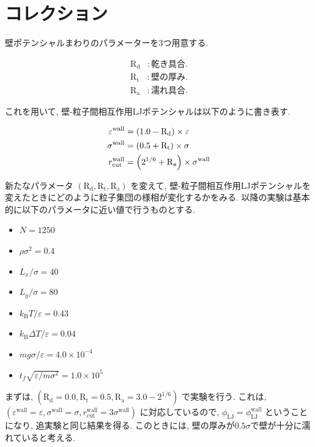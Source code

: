 \documentclass[dvipdfmx]{jsarticle}
\numberwithin{equation}{subsection}
\begin{document}
\section{コレクション}

壁ポテンシャルまわりのパラメーターを3つ用意する.

\begin{align}
  \text{R}_\text{d} &: 乾き具合. \\
  \text{R}_\text{t} &: 壁の厚み. \\
  \text{R}_\text{a} &: 濡れ具合.
\end{align}

これを用いて, 壁-粒子間相互作用LJポテンシャルは以下のように書き表す.

\begin{align}
  \varepsilon^{\text{wall}} &= \qty(1.0 - \text{R}_\text{d}) \times \varepsilon \\
  \sigma^{\text{wall}} &= \qty(0.5 + \text{R}_\text{t}) \times \sigma \\
  r^{\text{wall}}_{\text{cut}} &= \qty(2^{1/6} + \text{R}_\text{a}) \times \sigma^{\text{wall}}
\end{align}

新たなパラメータ $(\text{R}_\text{d}, \text{R}_\text{t}, \text{R}_\text{a})$ を変えて, 壁-粒子間相互作用LJポテンシャルを変えたときにどのように粒子集団の様相が変化するかをみる. 以降の実験は基本的に以下のパラメータに近い値で行うものとする. 

\begin{itemize}
  \item $N = 1250$
  \item $\rho {\sigma}^2 = 0.4$
  \item $L_x / \sigma = 40$
  \item $L_y / \sigma = 80$
  \item $k_{\text{B}} T / \varepsilon = 0.43$
  \item $k_{\text{B}} \Delta T / \varepsilon = 0.04$
  \item $mg\sigma/\varepsilon = 4.0 \times 10^{-4}$
  \item $t_f \sqrt{\varepsilon / m \sigma^2} = 1.0 \times 10^{5}$
\end{itemize}

まずは, $(\text{R}_\text{d} = 0.0, \text{R}_\text{t} = 0.5, \text{R}_\text{a} = 3.0 - 2^{1/6})$ で実験を行う. これは, $(\varepsilon^{\text{wall}} = \varepsilon, \sigma^{\text{wall}} = \sigma, r^{\text{wall}}_{\text{cut}} = 3\sigma^{\text{wall}})$ に対応しているので, $\phi_{\text{LJ}} = \phi_{\text{LJ}}^{\text{wall}}$ ということになり, 追実験と同じ結果を得る. このときには, 壁の厚みが$0.5\sigma$で壁が十分に濡れていると考える.
\end{document}

